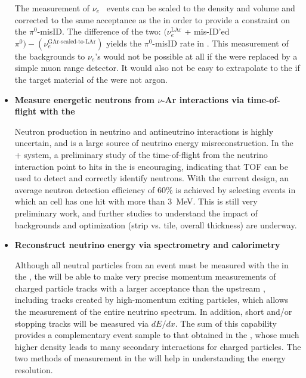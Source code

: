 \begin{itemize}
{The  measurement of $\nu_e$~ events can be scaled to the  density and volume and corrected to the same acceptance as the  in order to provide a constraint on the $\pi^0$-misID. The difference of the two: $(\nu_e^{{\textrm{LAr}}}$ + mis-ID'ed~$\pi^0)-(\nu_e^{\textrm{GAr-scaled-to-LAr}})$ yields the $\pi^0$-misID rate in . This measurement of the backgrounds to $\nu_e$'s would not be possible at all if the  were replaced by a simple muon range detector. It would also not be easy to extrapolate to the  if the target material of the  were not argon.

}

\item{{\bf Measure energetic neutrons from $\nu$-Ar interactions via time-of-flight with the }

Neutron production in neutrino and antineutrino interactions is highly uncertain, and is a large source of neutrino energy misreconstruction. In the + system, a preliminary study of the time-of-flight from the  neutrino interaction point to hits in the  is encouraging, indicating that TOF can be used to detect and correctly identify neutrons.  With the current  design, an average neutron detection efficiency of 60\% is achieved by selecting events in which an  cell has one hit with more than \SI{3}{MeV}. This is still very preliminary work, and further studies to understand the impact of backgrounds and  optimization (strip vs. tile, overall thickness) are underway.
    
}

\item{{\bf Reconstruct neutrino energy via spectrometry and calorimetry}
    
Although all neutral particles from an event must be measured with the  in the , the  will be able to make very precise momentum measurements of charged particle tracks with a larger acceptance than the upstream , including tracks created by high-momentum exiting particles, which allows the measurement of the entire neutrino spectrum.  In addition, short and/or stopping tracks will be measured via $dE/dx$.  The sum of this capability provides a complementary event sample to that obtained in the  , whose much higher density leads to many secondary interactions for charged particles. The two methods of measurement in the  will help in understanding the   energy resolution.
}


\end{itemize}
